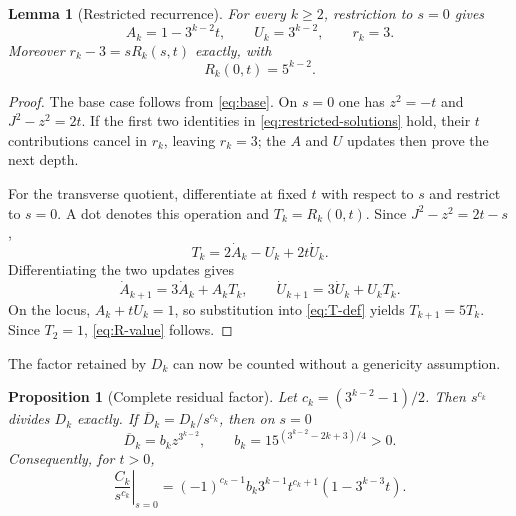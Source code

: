 \documentclass[11pt]{article}
\newtheorem{lemma}[theorem]{Lemma}
\newtheorem{proposition}[theorem]{Proposition}
\theoremstyle{remark}
\begin{document}
\begin{lemma}[Restricted recurrence]
\label{lem:restricted}
For every $k\geq2$, restriction to $s=0$ gives
\begin{equation}
 A_k=1-3^{k-2}t,\qquad U_k=3^{k-2},\qquad r_k=3.
 \label{eq:restricted-solutions}
\end{equation}
Moreover $r_k-3=sR_k(s,t)$ exactly, with
\begin{equation}
 R_k(0,t)=5^{k-2}.
 \label{eq:R-value}
\end{equation}
\end{lemma}

\begin{proof}
The base case follows from \cref{eq:base}.  On $s=0$ one has $z^2=-t$ and
$J^2-z^2=2t$.  If the first two identities in
\cref{eq:restricted-solutions} hold, their $t$ contributions cancel in
$r_k$, leaving $r_k=3$; the $A$ and $U$ updates then prove the next depth.

For the transverse quotient, differentiate at fixed $t$ with respect to $s$
and restrict to $s=0$.  A dot denotes this operation and
$T_k=R_k(0,t)$.  Since $J^2-z^2=2t-s$,
\begin{equation}
 T_k=2\dot A_k-U_k+2t\dot U_k.
 \label{eq:T-def}
\end{equation}
Differentiating the two updates gives
\begin{equation}
 \dot A_{k+1}=3\dot A_k+A_kT_k,\qquad
 \dot U_{k+1}=3\dot U_k+U_kT_k.
 \label{eq:dot-update}
\end{equation}
On the locus, $A_k+tU_k=1$, so substitution into \cref{eq:T-def} yields
$T_{k+1}=5T_k$.  Since $T_2=1$, \cref{eq:R-value} follows.
\end{proof}

The factor retained by $D_k$ can now be counted without a genericity
assumption.

\begin{proposition}[Complete residual factor]
\label{prop:residual}
Let $c_k=(3^{k-2}-1)/2$.  Then $s^{c_k}$ divides $D_k$ exactly.  If
$\overline D_k=D_k/s^{c_k}$, then on $s=0$
\begin{equation}
 \overline D_k=b_kz^{3^{k-2}},\qquad
 b_k=15^{(3^{k-2}-2k+3)/4}>0.
 \label{eq:Dbar}
\end{equation}
Consequently, for $t>0$,
\begin{equation}
 \left.\frac{C_k}{s^{c_k}}\right|_{s=0}
 =(-1)^{c_k-1}b_k3^{k-1}t^{c_k+1}
   \left(1-3^{k-3}t\right).
 \label{eq:complete-residual}
\end{equation}
\end{proposition}
\end{document}

